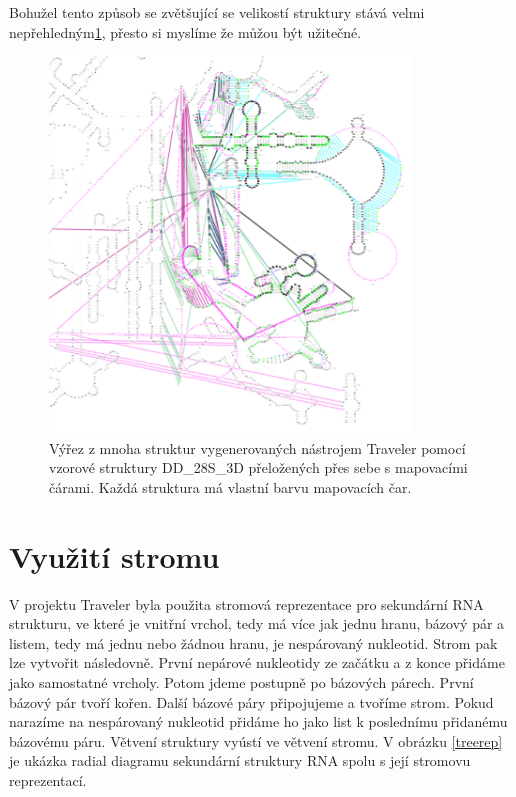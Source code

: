 Bohužel tento způsob se zvětšující se velikostí struktury stává velmi
nepřehledným\ref{uglylines}, přesto si myslíme že můžou být užitečné.

\begin{figure}[H]
  \centering
  \includegraphics[height=100mm]{../img/kap02/mappingLines/big.png}
  \caption[Ukázka mapovacích čar]{Výřez z mnoha struktur vygenerovaných nástrojem Traveler pomocí vzorové struktury DD\_28S\_3D přeložených přes sebe s mapovacími čárami.
  Každá struktura má vlastní barvu mapovacích čar.}
  \label{uglylines}
\end{figure}

\section{Využití stromu}

V projektu Traveler byla použita stromová reprezentace pro sekundární RNA
strukturu, ve které je vnitřní vrchol, tedy má více jak jednu hranu, bázový pár
a listem, tedy má jednu nebo žádnou hranu, je nespárovaný nukleotid. Strom pak
lze vytvořit následovně. První nepárové nukleotidy ze začátku a z konce přidáme
jako samostatné vrcholy. Potom jdeme postupně po bázových párech. První bázový
pár tvoří kořen. Další bázové páry připojujeme a tvoříme strom. Pokud narazíme
na nespárovaný nukleotid přidáme ho jako list k poslednímu přidanému bázovému
páru. Větvení struktury vyústí ve větvení stromu. V obrázku \ref{treerep} je
ukázka radial diagramu sekundární struktury RNA spolu s její stromovu
reprezentací.

